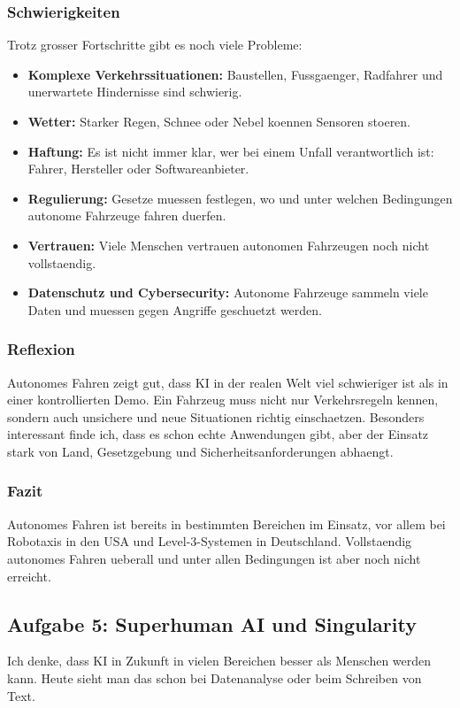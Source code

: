 \documentclass[12pt,a4paper]{article}
\begin{document}
\subsubsection*{Schwierigkeiten}

Trotz grosser Fortschritte gibt es noch viele Probleme:

\begin{itemize}
    \item \textbf{Komplexe Verkehrssituationen:} Baustellen, Fussgaenger, Radfahrer und unerwartete Hindernisse sind schwierig.
    \item \textbf{Wetter:} Starker Regen, Schnee oder Nebel koennen Sensoren stoeren.
    \item \textbf{Haftung:} Es ist nicht immer klar, wer bei einem Unfall verantwortlich ist: Fahrer, Hersteller oder Softwareanbieter.
    \item \textbf{Regulierung:} Gesetze muessen festlegen, wo und unter welchen Bedingungen autonome Fahrzeuge fahren duerfen.
    \item \textbf{Vertrauen:} Viele Menschen vertrauen autonomen Fahrzeugen noch nicht vollstaendig.
    \item \textbf{Datenschutz und Cybersecurity:} Autonome Fahrzeuge sammeln viele Daten und muessen gegen Angriffe geschuetzt werden.
\end{itemize}

\subsubsection*{Reflexion}

Autonomes Fahren zeigt gut, dass KI in der realen Welt viel schwieriger ist als in einer
kontrollierten Demo. Ein Fahrzeug muss nicht nur Verkehrsregeln kennen, sondern auch
unsichere und neue Situationen richtig einschaetzen. Besonders interessant finde ich,
dass es schon echte Anwendungen gibt, aber der Einsatz stark von Land, Gesetzgebung
und Sicherheitsanforderungen abhaengt.

\subsubsection*{Fazit}

Autonomes Fahren ist bereits in bestimmten Bereichen im Einsatz, vor allem bei Robotaxis
in den USA und Level-3-Systemen in Deutschland. Vollstaendig autonomes Fahren ueberall
und unter allen Bedingungen ist aber noch nicht erreicht.
\subsection{Aufgabe 5: Superhuman AI und Singularity}
Ich denke, dass KI in Zukunft in vielen Bereichen besser als Menschen werden kann.
Heute sieht man das schon bei Datenanalyse oder beim Schreiben von Text.
\end{document}
